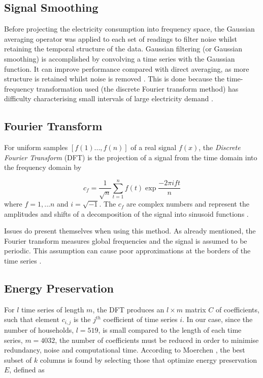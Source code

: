 \subsection*{Signal Smoothing}

Before projecting the electricity consumption into frequency space, the Gaussian averaging operator was applied to each set of readings to filter noise whilst retaining the temporal structure of the data. Gaussian filtering (or Gaussian smoothing) is accomplished by convolving a time series with the Gaussian function. It can improve performance compared with direct averaging, as more structure is retained whilst noise is removed \cite{Nixon}. This is done because the time-frequency transformation used (the discrete Fourier transform method) has difficulty characterising small intervals of large electricity demand \cite{Graps}.






\subsection*{Fourier Transform}

For uniform samples $[f(1)...,f(n)]$ of a real signal $f(x)$, the \textit{Discrete Fourier Transform} (DFT) is the projection of a signal from the time domain into the frequency domain by

\[c_f=\frac{1}{\sqrt{n}}\sum_{t=1}^nf(t)\exp{\frac{-2\pi ift}{n}}\]
where $f=1,...n$ and $i=\sqrt{-1}$. The $c_f$ are complex numbers and represent
the amplitudes and shifts of a decomposition of the signal into sinusoid functions \cite{Moerchen}.


Issues do present themselves when using this method. As already mentioned, the Fourier transform measures global frequencies and the signal is assumed to be periodic. This assumption can cause poor approximations at the borders of the time series \cite{Moerchen}.

\subsection*{Energy Preservation}

For $l$ time series of length $m$, the DFT produces an $l \times m$ matrix $C $ of coefficients, such that element $c_{i,j}$ is the $j^{th}$ coefficient of time series $i$. In our case, since the number of households, $l=519$, is small compared to the length of each time series, $m=4032$, the number of coefficients must be reduced in order to minimise redundancy, noise and computational time. According to Moerchen \cite{Moerchen}, the best subset of $k$ columns is found by selecting those that optimize energy preservation $E$, defined as

